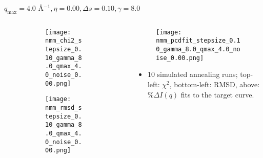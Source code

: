 \documentclass{beamer}
\begin{document}
\begin{frame}{$ q_{\textrm{max}}=4.0 $ \AA $^{-1}, \eta=0.00, \Delta s=0.10, \gamma=8.0$}
	\begin{columns}
		\begin{column}{.5\textwidth}
			\begin{figure}[H]
			\centering
			\begin{subfigure}[b]{\textwidth}
				\centering
				\texttt{[image: nmm\_chi2\_stepsize\_0.10\_gamma\_8.0\_qmax\_4.0\_noise\_0.00.png]}
				\label{fig:}
			\end{subfigure}
			\begin{subfigure}[b]{\textwidth}
				\centering
				\texttt{[image: nmm\_rmsd\_stepsize\_0.10\_gamma\_8.0\_qmax\_4.0\_noise\_0.00.png]}
				\label{fig:}
			\end{subfigure}
			\end{figure}
		\end{column}
		\begin{column}{.5\textwidth}
			\begin{figure}[H]
				\centering
				\texttt{[image: nmm\_pcdfit\_stepsize\_0.10\_gamma\_8.0\_qmax\_4.0\_noise\_0.00.png]}
				\label{fig:}
			\end{figure}
			\begin{itemize}
				\item 10 simulated annealing runs; top-left: $\chi^2$, bottom-left: RMSD, above: $\%\Delta I(q)$ fits to the target curve.
			\end{itemize}
		\end{column}
	\end{columns}
\end{frame}
 
\end{document}
